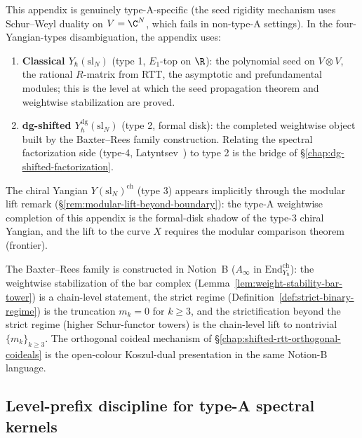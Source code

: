 \begin{convention}
\label{conv:typeA-baxter-rees-yangian-types}
This appendix is genuinely type-A-specific (the seed rigidity
mechanism uses Schur--Weyl duality on $V = \C^N$, which fails in
non-type-A settings). In the four-Yangian-types disambiguation, the
appendix uses:
\begin{enumerate}[label=\textup{(\arabic*)}]
\item \textbf{Classical $Y_\hbar(\mathrm{sl}_N)$} (type 1, $E_1$-top
on $\R$): the polynomial seed on $V\otimes V$, the rational
$R$-matrix from RTT, the asymptotic and prefundamental
modules; this is the level at which the seed propagation theorem
and weightwise stabilization are proved.
\item \textbf{dg-shifted $Y^{\mathrm{dg}}_\hbar(\mathrm{sl}_N)$}
(type 2, formal disk): the completed weightwise object built by
the Baxter--Rees family construction. Relating the spectral
factorization side
(type-4, Latyntsev~\cite{Latyntsev23}) to type 2 is the bridge of
\S\ref{chap:dg-shifted-factorization}.
\end{enumerate}
The chiral Yangian $Y(\mathrm{sl}_N)^{\mathrm{ch}}$ (type 3) appears
implicitly through the modular lift remark
(\S\ref{rem:modular-lift-beyond-boundary}): the type-A weightwise
completion of this appendix is the formal-disk shadow of the
type-3 chiral Yangian, and the lift to the curve $X$ requires
the modular comparison theorem (frontier).
\end{convention}

\begin{remark}
\label{rem:typeA-baxter-rees-notion-b}
The Baxter--Rees family is constructed in Notion~B
($A_\infty$ in $\mathrm{End}^{\mathrm{ch}}_{Y_\hbar}$): the
weightwise stabilization of the bar complex
(Lemma~\ref{lem:weight-stability-bar-tower}) is a chain-level
statement, the strict regime
(Definition~\ref{def:strict-binary-regime}) is the truncation
$m_k=0$ for $k\ge 3$, and the strictification beyond the strict
regime (higher Schur-functor towers) is the chain-level lift to
nontrivial $\{m_k\}_{k\ge 3}$. The orthogonal coideal mechanism of
\S\ref{chap:shifted-rtt-orthogonal-coideals} is the open-colour
Koszul-dual presentation in the same Notion-B language.
\end{remark}

\subsection{Level-prefix discipline for type-A spectral kernels}
\label{subsec:typeA-baxter-rees-rmatrix-level-prefix}

